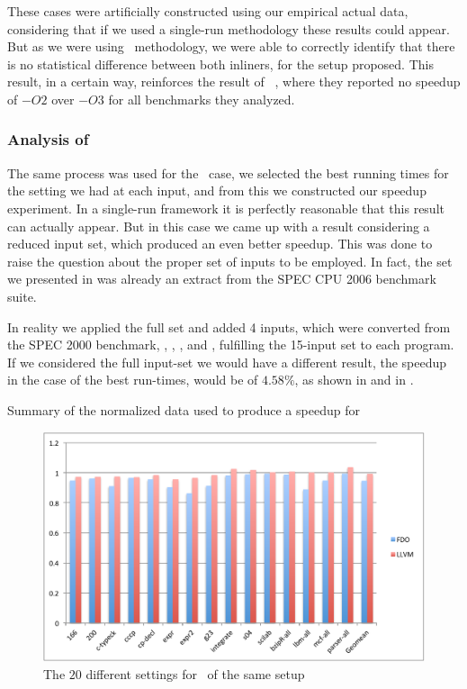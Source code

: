 These cases were artificially constructed using our empirical actual data, considering that if we used a single-run methodology these results could appear. But as we were using \CP\ methodology, we were able to correctly identify that there is no statistical difference between both inliners, for the setup proposed. This result, in a certain way, reinforces the result of ~\cite{Curtsinger2013}, where they reported no speedup of $-O2$ over $-O3$ for all benchmarks they analyzed.


\subsubsection{Analysis of \gcc}

The same process was used for the \gcc\ case, we selected the best running times for the setting we had at each input, and from this we constructed our speedup experiment. In a single-run framework it is perfectly reasonable that this result can actually appear. But in this case we came up with a result considering a reduced input set, which produced an even better speedup. This was done to raise the question about the proper set of inputs to be employed. In fact, the set we presented in  was already an extract from the SPEC CPU 2006 benchmark suite.

In reality we applied the full set and added 4 inputs, which were converted from the SPEC 2000 benchmark, \bzip, \lbm, \mcf, and \parser, fulfilling the 15-input set to each program. If we considered the full input-set we would have a different result, the speedup in the case of the best run-times, would be of $4.58 \%$, as shown in  and in .

\begin{table}
  \centering
  \begin{tiny}
  
  \end{tiny}
  \caption{Summary of the normalized data used to produce a speedup for \gcc}
  \label{tab:fullspeedup}
\end{table}

\begin{figure}
  \centering
  \includegraphics[width=1.00\linewidth]{Figures/speedupgccall}
  \caption{The $20$ different settings for \gcc\ of the same setup}
  \label{fig:gccall}
\end{figure}

